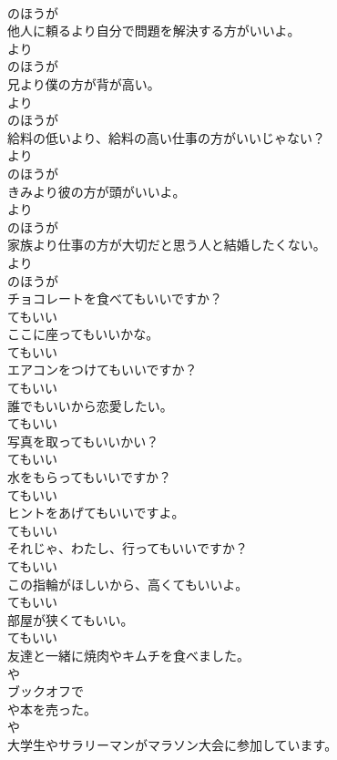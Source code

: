 \documentclass[8pt]{extreport}
\begin{document}
\begin{CJK}{UTF8}{min}
\\	のほうが 
\\	他人に頼るより自分で問題を解決する方がいいよ。	
\\	より 
\\	のほうが 
\\	兄より僕の方が背が高い。	
\\	より 
\\	のほうが 
\\	給料の低いより、給料の高い仕事の方がいいじゃない？	
\\	より 
\\	のほうが 
\\	きみより彼の方が頭がいいよ。	
\\	より 
\\	のほうが 
\\	家族より仕事の方が大切だと思う人と結婚したくない。	
\\	より 
\\	のほうが 
\\	チョコレートを食べてもいいですか？	
\\	てもいい
\\	ここに座ってもいいかな。	
\\	てもいい
\\	エアコンをつけてもいいですか？	
\\	てもいい
\\	誰でもいいから恋愛したい。	
\\	てもいい
\\	写真を取ってもいいかい？	
\\	てもいい
\\	水をもらってもいいですか？	
\\	てもいい
\\	ヒントをあげてもいいですよ。	
\\	てもいい
\\	それじゃ、わたし、行ってもいいですか？	
\\	てもいい
\\	この指輪がほしいから、高くてもいいよ。	
\\	てもいい
\\	部屋が狭くてもいい。	
\\	てもいい
\\	友達と一緒に焼肉やキムチを食べました。	
\\	や
\\	ブックオフで
\\	や本を売った。	
\\	や
\\	大学生やサラリーマンがマラソン大会に参加しています。	

\end{CJK}
\end{document}
